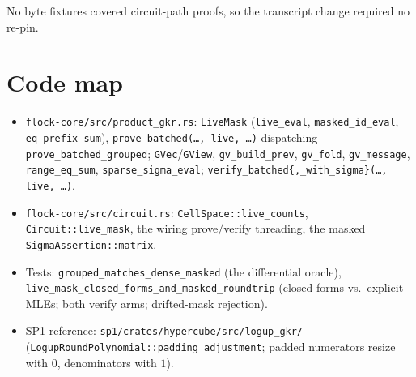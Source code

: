\documentclass[11pt]{article}
\newcommand{\code}[1]{\texttt{#1}}
\theoremstyle{definition}
\begin{document}
No byte fixtures covered circuit-path proofs, so the transcript change
required no re-pin.

\section{Code map}

\begin{itemize}[leftmargin=2em]
\item \code{flock-core/src/product\_gkr.rs}: \code{LiveMask}
  (\code{live\_eval}, \code{masked\_id\_eval}, \code{eq\_prefix\_sum}),
  \code{prove\_batched(\dots, live, \dots)} dispatching
  \code{prove\_batched\_grouped}; \code{GVec}/\code{GView},
  \code{gv\_build\_prev}, \code{gv\_fold}, \code{gv\_message},
  \code{range\_eq\_sum}, \code{sparse\_sigma\_eval};
  \code{verify\_batched\{,\_with\_sigma\}(\dots, live, \dots)}.
\item \code{flock-core/src/circuit.rs}: \code{CellSpace::live\_counts},
  \code{Circuit::live\_mask}, the wiring prove/verify threading, the
  masked \code{SigmaAssertion::matrix}.
\item Tests: \code{grouped\_matches\_dense\_masked} (the differential
  oracle), \code{live\_mask\_closed\_forms\_and\_masked\_roundtrip}
  (closed forms vs.\ explicit MLEs; both verify arms; drifted-mask
  rejection).
\item SP1 reference: \code{sp1/crates/hypercube/src/logup\_gkr/}
  (\code{LogupRoundPolynomial::padding\_adjustment}; padded numerators
  resize with $0$, denominators with $1$).
\end{itemize}
\end{document}
